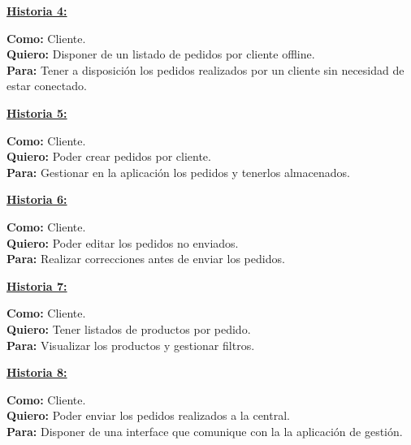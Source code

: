 \clearpage

\begin{shaded}
	\underline{\textbf{Historia 4:}}
	\begin{flushleft}	
		\textbf{Como:} Cliente.\\
		\textbf{Quiero:} Disponer de un listado de pedidos por cliente offline.\\
		\textbf{Para:} Tener a disposición los pedidos realizados por un cliente sin necesidad de estar conectado.\\ 
	\end{flushleft}			
\end{shaded}

\begin{shaded}
	\underline{\textbf{Historia 5:}}
	\begin{flushleft}	
		\textbf{Como:} Cliente.\\
		\textbf{Quiero:} Poder crear pedidos por cliente.\\
		\textbf{Para:} Gestionar en la aplicación los pedidos y tenerlos almacenados.\\ 
	\end{flushleft}			
\end{shaded}

\begin{shaded}
	\underline{\textbf{Historia 6:}}
	\begin{flushleft}	
		\textbf{Como:} Cliente.\\
		\textbf{Quiero:}  Poder editar los pedidos no enviados.\\
		\textbf{Para:} Realizar correcciones antes de enviar los pedidos.\\ 
	\end{flushleft}			
\end{shaded}

\begin{shaded}
	\underline{\textbf{Historia 7:}}
	\begin{flushleft}	
		\textbf{Como:} Cliente.\\
		\textbf{Quiero:} Tener listados de productos por pedido.\\
		\textbf{Para:} Visualizar los productos y gestionar filtros.\\ 
	\end{flushleft}			
\end{shaded}

\begin{shaded}
	\underline{\textbf{Historia 8:}}
	\begin{flushleft}	
		\textbf{Como:} Cliente.\\
		\textbf{Quiero:} Poder enviar los pedidos realizados a la central.\\
		\textbf{Para:} Disponer de una interface que comunique con la la aplicación de gestión.\\ 
	\end{flushleft}			
\end{shaded}

